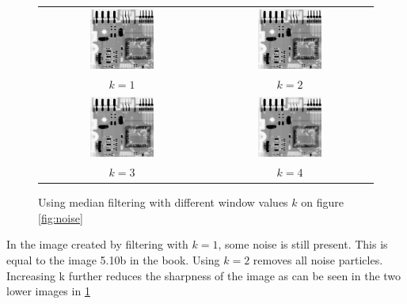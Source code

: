 \documentclass[a4paper]{article}
\begin{document}
\begin{enumerate}
\begin{figure}[H]
\begin{tabular}{cc}
    \includegraphics[width=0.4\textwidth]{../lab2ex3/restored1.png} &
    \includegraphics[width=0.4\textwidth]{../lab2ex3/restored2.png}\\
    $k = 1$ & $k = 2$ \\
    \includegraphics[width=0.4\textwidth]{../lab2ex3/restored3.png} &
    \includegraphics[width=0.4\textwidth]{../lab2ex3/restored4.png}\\
    $k = 3$ & $k = 4$
    
\end{tabular}
\caption{Using median filtering with different window values $k$ on figure \ref{fig:noise}} 
\label{fig:restored}
\end{figure}
In the image created by filtering with $k=1$, some noise is still present.
This is equal to the image 5.10b in the book. Using $k=2$ removes all noise particles.
Increasing k further reduces the sharpness of the image as can be seen in the two lower 
images in \ref{fig:restored}
\end{enumerate}
\end{document}
